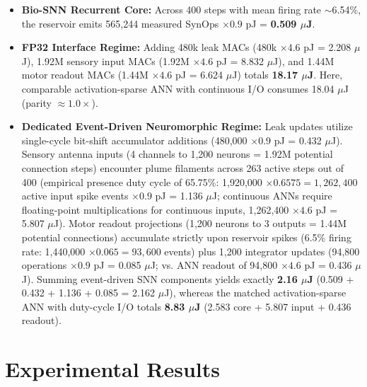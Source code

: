 \documentclass[conference]{IEEEtran}
\begin{document}
\begin{itemize}
    \item \textbf{Bio-SNN Recurrent Core:} Across 400 steps with mean firing rate $\sim$6.54\%, the reservoir emits 565,244 measured SynOps $\times 0.9$ pJ = \textbf{0.509 $\mu$J}.
    \item \textbf{FP32 Interface Regime:} Adding 480k leak MACs (480k $\times 4.6$ pJ = 2.208 $\mu$J), 1.92M sensory input MACs (1.92M $\times 4.6$ pJ = 8.832 $\mu$J), and 1.44M motor readout MACs (1.44M $\times 4.6$ pJ = 6.624 $\mu$J) totals \textbf{18.17 $\mu$J}. Here, comparable activation-sparse ANN with continuous I/O consumes 18.04 $\mu$J (parity $\approx 1.0\times$).
    \item \textbf{Dedicated Event-Driven Neuromorphic Regime:} Leak updates utilize single-cycle bit-shift accumulator additions (480,000 $\times 0.9$ pJ = 0.432 $\mu$J). Sensory antenna inputs (4 channels to 1,200 neurons = 1.92M potential connection steps) encounter plume filaments across 263 active steps out of 400 (empirical presence duty cycle of 65.75\%: 1,920,000 $\times 0.6575 = 1,262,400$ active input spike events $\times 0.9$ pJ = 1.136 $\mu$J; continuous ANNs require floating-point multiplications for continuous inputs, 1,262,400 $\times 4.6$ pJ = 5.807 $\mu$J). Motor readout projections (1,200 neurons to 3 outputs = 1.44M potential connections) accumulate strictly upon reservoir spikes (6.5\% firing rate: 1,440,000 $\times 0.065 = 93,600$ events) plus 1,200 integrator updates (94,800 operations $\times 0.9$ pJ = 0.085 $\mu$J; vs. ANN readout of 94,800 $\times 4.6$ pJ = 0.436 $\mu$J). Summing event-driven SNN components yields exactly \textbf{2.16 $\mu$J} (0.509 + 0.432 + 1.136 + 0.085 = 2.162 $\mu$J), whereas the matched activation-sparse ANN with duty-cycle I/O totals \textbf{8.83 $\mu$J} (2.583 core + 5.807 input + 0.436 readout).
\end{itemize}

\section{Experimental Results}
\end{document}

